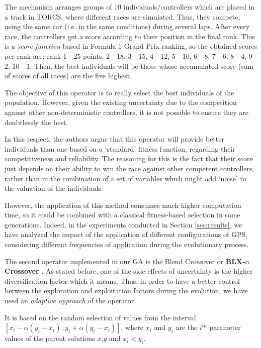 \documentclass[10pt,journal,compsoc]{IEEEtran}
\begin{document}
The mechanism arranges groups of 10 individuals/controllers which are placed in a track in TORCS, where different races are simulated. Thus, they compete, using the same car (i.e. in the same conditions) during several laps. After every race, the controllers get a score according to their position in the final rank. This is a \textit{score function} based in Formula 1 Grand Prix ranking, so the obtained scores per rank are: rank 1 - 25 points, 2 - 18, 3 - 15, 4 - 12, 5 - 10, 6 - 8, 7 - 6, 8 - 4, 9 - 2, 10 - 1.
Then, the best individuals will be those whose accumulated score (sum of scores of all races) are the five highest.

The objective of this operator is to really select the best
individuals of the population. However, given the existing uncertainty
\cite{merelo2016statistical} due to the competition against other
non-deterministic controllers, it is not possible to ensure they are
doubtlessly the best. 

In this respect, the authors argue that this operator will provide better individuals than one based on a `standard' fitness function, regarding their competitiveness and reliability. The reasoning for this is the fact that their score just depends on their ability to win the race against other competent controllers, rather than in the combination of a set of variables which might add `noise' to the valuation of the individuals.

However, the application of this method consumes much higher computation time, so it could be combined with a classical fitness-based selection in some generations. Indeed, in the experiments conducted in Section \ref{sec:results}, we have analyzed the impact of the application of different configurations of GPS, considering different frequencies of application during the evolutionary process.

The second operator implemented in our GA is the Blend Crossover or  \textbf{BLX-$\alpha$ Crossover} \cite{blx2008}. As stated before, one of the side effects of uncertainty is the higher diversification factor which it means. Thus, in order to have a better control between the exploration and exploitation factors during the evolution, we have used an \textit{adaptive approach} of the operator.

It is based on the random selection of values from the interval
$[x_i-\alpha(y_i-x_i).. y_i+\alpha(y_i-x_i)]$, where $x_i$ and $y_i$
are the $i^{th}$ parameter values of the parent solutions $x$,$y$ and
$x_i < y_i$. %
\end{document}
